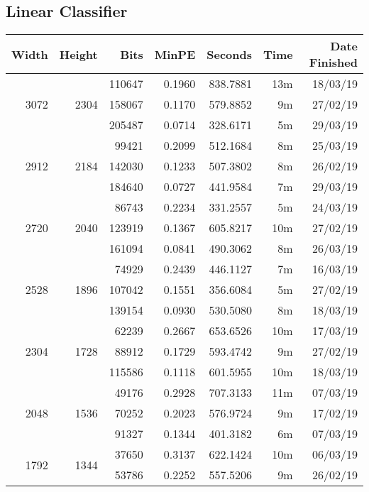 \subsection{Linear Classifier}
  \begin{center}
  \begin{tabular}{ r r r | r | r r r }
  Width & Height & Bits & MinPE & Seconds & Time & Date Finished \\ \hline
  \multirow{3}{*}{3072} & \multirow{3}{*}{2304} & 110647 & 0.1960 & 838.7881 & 13m & 18/03/19 \\
  & & 158067 & 0.1170 & 579.8852 & 9m & 27/02/19 \\
  & & 205487 & 0.0714 & 328.6171 & 5m & 29/03/19 \\
  \hline
  \multirow{3}{*}{2912} & \multirow{3}{*}{2184} & 99421 & 0.2099 & 512.1684 & 8m & 25/03/19 \\
  & & 142030 & 0.1233 & 507.3802 & 8m & 26/02/19 \\
  & & 184640 & 0.0727 & 441.9584 & 7m & 29/03/19 \\
  \hline
  \multirow{3}{*}{2720} & \multirow{3}{*}{2040} & 86743 & 0.2234 & 331.2557 & 5m & 24/03/19 \\
  & & 123919 & 0.1367 & 605.8217 & 10m & 27/02/19 \\
  & & 161094 & 0.0841 & 490.3062 & 8m & 26/03/19 \\
  \hline
  \multirow{3}{*}{2528} & \multirow{3}{*}{1896} & 74929 & 0.2439 & 446.1127 & 7m & 16/03/19 \\
  & & 107042 & 0.1551 & 356.6084 & 5m & 27/02/19 \\
  & & 139154 & 0.0930 & 530.5080 & 8m & 18/03/19 \\
  \hline
  \multirow{3}{*}{2304} & \multirow{3}{*}{1728} & 62239 & 0.2667 & 653.6526 & 10m & 17/03/19 \\
  & & 88912 & 0.1729 & 593.4742 & 9m & 27/02/19 \\
  & & 115586 & 0.1118 & 601.5955 & 10m & 18/03/19 \\
  \hline
  \multirow{3}{*}{2048} & \multirow{3}{*}{1536} & 49176 & 0.2928 & 707.3133 & 11m & 07/03/19 \\
  & & 70252 & 0.2023 & 576.9724 & 9m & 17/02/19 \\
  & & 91327 & 0.1344 & 401.3182 & 6m & 07/03/19 \\
  \hline
  \multirow{3}{*}{1792} & \multirow{3}{*}{1344} & 37650 & 0.3137 & 622.1424 & 10m & 06/03/19 \\
  & & 53786 & 0.2252 & 557.5206 & 9m & 26/02/19 \\

\end{tabular}
\end{center}
